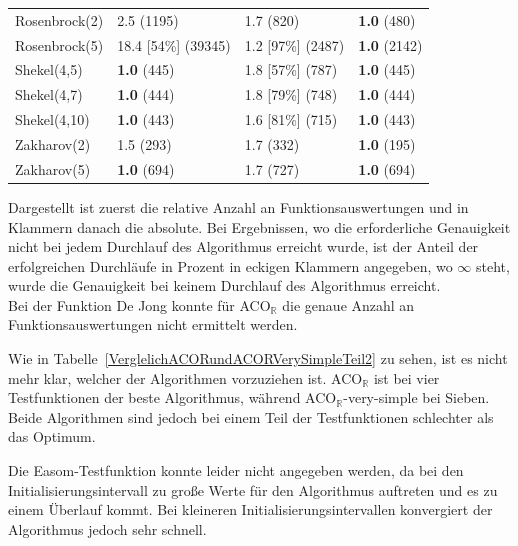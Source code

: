 \documentclass[fontsize=12, a4aper]{scrartcl}
\begin{document}
\begin{table}[H]
\begin{tabularx}{\textwidth}{l|l|l|l}
			Rosenbrock(2) & 2.5 (1195) & 1.7 (820) & \textbf{1.0} (480)\\
			
			Rosenbrock(5) & 18.4 [54\%] (39345) & 1.2 [97\%] (2487) & \textbf{1.0} (2142)\\
			
			Shekel(4,5) & \textbf{1.0} (445) & 1.8 [57\%] (787) & \textbf{1.0} (445)\\
			
			Shekel(4,7) & \textbf{1.0} (444) & 1.8 [79\%] (748) & \textbf{1.0} (444)\\
			
			Shekel(4,10) & \textbf{1.0} (443) & 1.6 [81\%] (715) & \textbf{1.0} (443)\\
			
			Zakharov(2) & 1.5 (293) & 1.7 (332) & \textbf{1.0} (195)\\
			
			Zakharov(5) & \textbf{1.0} (694) & 1.7 (727) & \textbf{1.0} (694)\\
			
		\end{tabularx}
		
		\smallskip
		
		Dargestellt ist zuerst die relative Anzahl an Funktionsauswertungen und in Klammern danach die absolute. Bei Ergebnissen, wo die erforderliche Genauigkeit nicht bei jedem Durchlauf des Algorithmus erreicht wurde, ist der Anteil der erfolgreichen Durchläufe in Prozent in eckigen Klammern angegeben, wo \(\infty\) steht, wurde die Genauigkeit bei keinem Durchlauf des Algorithmus erreicht.\\
		Bei der Funktion \glqq De Jong\grqq \hspace{.16667em} konnte für ACO\(_{\mathbb{R}}\) die genaue Anzahl an Funktionsauswertungen nicht ermittelt werden.\hfill\newline
		
	\end{table}

	Wie in Tabelle~\ref{VerglelichACORundACORVerySimpleTeil2} zu sehen, ist es nicht mehr klar, welcher der Algorithmen vorzuziehen ist. ACO\(_{\mathbb{R}}\) ist bei vier Testfunktionen der beste Algorithmus, während ACO\(_{\mathbb{R}}\)-very-simple bei Sieben. Beide Algorithmen sind jedoch bei einem Teil der Testfunktionen schlechter als das Optimum.\hfill\newline
	
	Die Easom-Testfunktion konnte leider nicht angegeben werden, da bei den Initialisierungsintervall zu große Werte für den Algorithmus auftreten und es zu einem Überlauf kommt. Bei kleineren Initialisierungsintervallen konvergiert der Algorithmus jedoch sehr schnell.\hfill\newline
	
\end{document}
